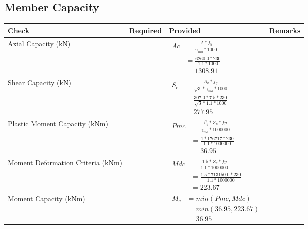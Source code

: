 \documentclass{article}%
\begin{document}
\subsection{Member Capacity}%
\label{subsec:MemberCapacity}%
\renewcommand{\arraystretch}{1.2}%
\begin{longtable}{|p{4cm}|p{5cm}|p{5.5cm}|p{1.5cm}|}%
\hline%
\rowcolor{OsdagGreen}%
Check&Required&Provided&Remarks\\%
\hline%
\endhead%
\hline%
Axial Capacity (kN)&&$\begin{aligned} Ac &=\frac{A*f_y}{\gamma_{m0} *1000}\\ &=\frac{6260.0*230}{1.1* 1000}\\ &=1308.91\end{aligned}$&\\%
\hline%
Shear Capacity (kN)&&$\begin{aligned} S_c &= \frac{A_v*f_y}{\sqrt{3}*\gamma_{mo} *1000}\\ &=\frac{307.0*7.5*230}{\sqrt{3}*1.1 *1000}\\ &=277.95\end{aligned}$&\\%
\hline%
Plastic Moment Capacity (kNm)&&$\begin{aligned} Pmc &= \frac{\beta_b * Z_p *fy}{\gamma_{mo} * 1000000}\\ &=\frac{1*176717*230}{1.1 * 1000000}\\ &=36.95\end{aligned}$&\\%
\hline%
Moment Deformation Criteria (kNm)&&$\begin{aligned} Mdc &= \frac{1.5 *Z_e *fy}{1.1 * 1000000}\\ &= \frac{1.5 *713150.0*230}{1.1 * 1000000}\\ &= 223.67\end{aligned}$&\\%
\hline%
Moment Capacity (kNm)&&$\begin{aligned} M_c &= min(Pmc,Mdc)\\ &=min(36.95,223.67)\\ &=36.95\end{aligned}$&\\%
\hline%
\end{longtable}

%
\newpage%
\end{document}
